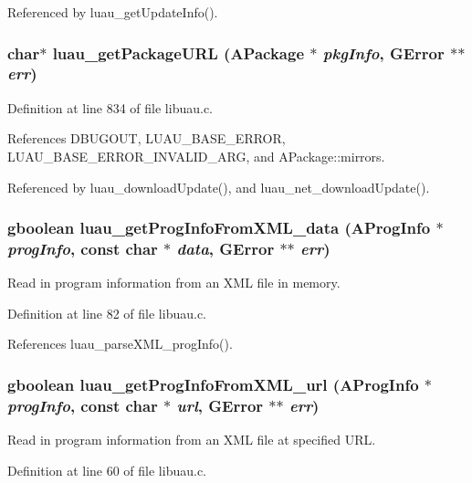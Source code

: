 Referenced by luau\_\-get\-Update\-Info().
\subsubsection{\setlength{\rightskip}{0pt plus 5cm}char$\ast$ luau\_\-get\-Package\-URL ({\bf APackage} $\ast$ {\em pkg\-Info}, GError $\ast$$\ast$ {\em err})}\label{libuau_8c_a26}




Definition at line 834 of file libuau.c.

References DBUGOUT, LUAU\_\-BASE\_\-ERROR, LUAU\_\-BASE\_\-ERROR\_\-INVALID\_\-ARG, and APackage::mirrors.

Referenced by luau\_\-download\-Update(), and luau\_\-net\_\-download\-Update().
\subsubsection{\setlength{\rightskip}{0pt plus 5cm}gboolean luau\_\-get\-Prog\-Info\-From\-XML\_\-data ({\bf AProg\-Info} $\ast$ {\em prog\-Info}, const char $\ast$ {\em data}, GError $\ast$$\ast$ {\em err})}\label{libuau_8c_a6}


Read in program information from an XML file in memory. 



Definition at line 82 of file libuau.c.

References luau\_\-parse\-XML\_\-prog\-Info().
\subsubsection{\setlength{\rightskip}{0pt plus 5cm}gboolean luau\_\-get\-Prog\-Info\-From\-XML\_\-url ({\bf AProg\-Info} $\ast$ {\em prog\-Info}, const char $\ast$ {\em url}, GError $\ast$$\ast$ {\em err})}\label{libuau_8c_a5}


Read in program information from an XML file at specified URL. 



Definition at line 60 of file libuau.c.

